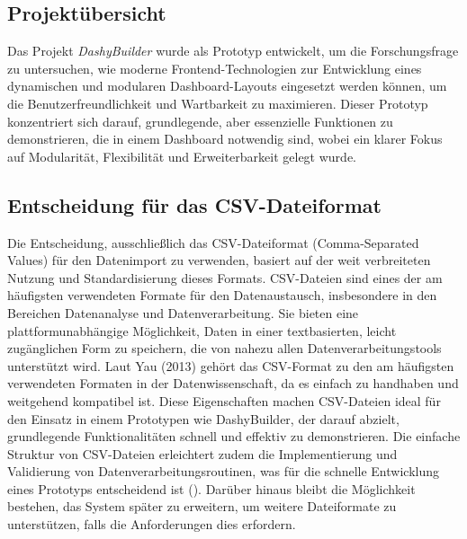 \documentclass[a4paper, 12pt]{scrartcl}
\begin{document}
{\subsection{Projektübersicht}}

Das Projekt \textit{DashyBuilder} wurde als Prototyp entwickelt, um die Forschungsfrage zu untersuchen, wie moderne Frontend-Technologien zur Entwicklung eines dynamischen und modularen Dashboard-Layouts eingesetzt werden können, um die Benutzerfreundlichkeit und Wartbarkeit zu maximieren. Dieser Prototyp konzentriert sich darauf, grundlegende, aber essenzielle Funktionen zu demonstrieren, die in einem Dashboard notwendig sind, wobei ein klarer Fokus auf Modularität, Flexibilität und Erweiterbarkeit gelegt wurde.

\subsection{Entscheidung für das CSV-Dateiformat}
Die Entscheidung, ausschließlich das CSV-Dateiformat (Comma-Separated Values) für den Datenimport zu verwenden, basiert auf der weit verbreiteten Nutzung und Standardisierung dieses Formats. CSV-Dateien sind eines der am häufigsten verwendeten Formate für den Datenaustausch, insbesondere in den Bereichen Datenanalyse und Datenverarbeitung. Sie bieten eine plattformunabhängige Möglichkeit, Daten in einer textbasierten, leicht zugänglichen Form zu speichern, die von nahezu allen Datenverarbeitungstools unterstützt wird. Laut Yau (2013) gehört das CSV-Format zu den am häufigsten verwendeten Formaten in der Datenwissenschaft, da es einfach zu handhaben und weitgehend kompatibel ist. Diese Eigenschaften machen CSV-Dateien ideal für den Einsatz in einem Prototypen wie DashyBuilder, der darauf abzielt, grundlegende Funktionalitäten schnell und effektiv zu demonstrieren. Die einfache Struktur von CSV-Dateien erleichtert zudem die Implementierung und Validierung von Datenverarbeitungsroutinen, was für die schnelle Entwicklung eines Prototyps entscheidend ist (\cite[S.119]{Dibia2023}). Darüber hinaus bleibt die Möglichkeit bestehen, das System später zu erweitern, um weitere Dateiformate zu unterstützen, falls die Anforderungen dies erfordern.
\end{document}
